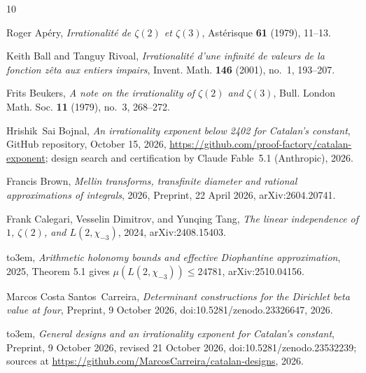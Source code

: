 \documentclass[11pt]{amsart}
\theoremstyle{definition}
\theoremstyle{remark}
\numberwithin{equation}{section}
\begin{document}
\providecommand{\bysame}{\leavevmode\hbox to3em{\hrulefill}\thinspace}
\providecommand{\MR}{\relax\ifhmode\unskip\space\fi MR }
\providecommand{\MRhref}[2]{%
  \href{http://www.ams.org/mathscinet-getitem?mr=#1}{#2}
}
\providecommand{\href}[2]{#2}
\begin{thebibliography}{10}

Roger Ap\'ery, \emph{Irrationalit\'e de {$\zeta(2)$} et {$\zeta(3)$}},
  Ast\'erisque \textbf{61} (1979), 11--13.

Keith Ball and Tanguy Rivoal, \emph{Irrationalit\'e d'une infinit\'e de valeurs
  de la fonction z\^eta aux entiers impairs}, Invent. Math. \textbf{146}
  (2001), no.~1, 193--207.

Frits Beukers, \emph{A note on the irrationality of {$\zeta(2)$} and
  {$\zeta(3)$}}, Bull. London Math. Soc. \textbf{11} (1979), no.~3, 268--272.

Hrishik~Sai Bojnal, \emph{An irrationality exponent below 2402 for {C}atalan's
  constant}, GitHub repository, October 15, 2026,
  \url{https://github.com/proof-factory/catalan-exponent}; design search and
  certification by Claude Fable~5.1 (Anthropic), 2026.

Francis Brown, \emph{Mellin transforms, transfinite diameter and rational
  approximations of integrals}, 2026, Preprint, 22 April 2026,
  \href{https://arxiv.org/abs/2604.20741}{arXiv:2604.20741}.

Frank Calegari, Vesselin Dimitrov, and Yunqing Tang, \emph{The linear
  independence of {$1$}, {$\zeta(2)$}, and {$L(2,\chi_{-3})$}}, 2024,
  \href{https://arxiv.org/abs/2408.15403}{arXiv:2408.15403}.

\bysame, \emph{Arithmetic holonomy bounds and effective {D}iophantine
  approximation}, 2025, Theorem 5.1 gives $\mu(L(2,\chi_{-3}))\le 24781$,
  \href{https://arxiv.org/abs/2510.04156}{arXiv:2510.04156}.

Marcos Costa Santos~Carreira, \emph{Determinant constructions for the
  {D}irichlet beta value at four}, Preprint, 9 October 2026,
  \href{https://doi.org/10.5281/zenodo.23326647}{doi:10.5281/zenodo.23326647},
  2026.

\bysame, \emph{General designs and an irrationality exponent for {C}atalan's
  constant}, Preprint, 9 October 2026, revised 21 October 2026,
  \href{https://doi.org/10.5281/zenodo.23532239}{doi:10.5281/zenodo.23532239};
  sources at \url{https://github.com/MarcosCarreira/catalan-designs}, 2026.


\end{thebibliography}
\end{document}
